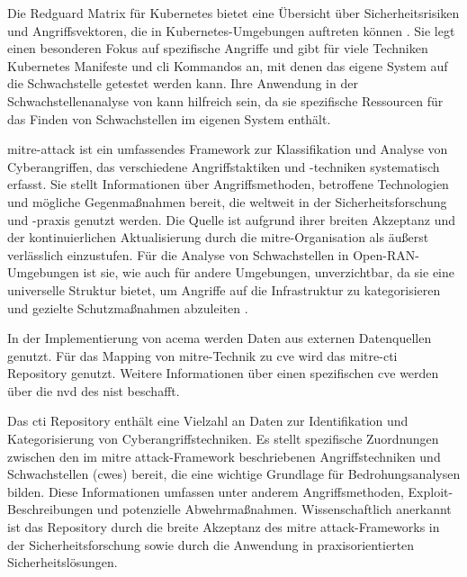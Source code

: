 \par Die Redguard Matrix für Kubernetes bietet eine Übersicht über Sicherheitsrisiken und Angriffsvektoren, die in Kubernetes-Umgebungen auftreten können \autocite{KubernetesThreatMatrix}. Sie legt einen besonderen Fokus auf spezifische Angriffe und gibt für viele Techniken Kubernetes Manifeste und \gls{cli} Kommandos an, mit denen das eigene System auf die Schwachstelle getestet werden kann. Ihre Anwendung in der Schwachstellenanalyse von \oran kann hilfreich sein, da sie spezifische Ressourcen für das Finden von Schwachstellen im eigenen System enthält.

\par \gls{mitre}-\gls{attack} ist ein umfassendes Framework zur Klassifikation und Analyse von Cyberangriffen, das verschiedene Angriffstaktiken und -techniken systematisch erfasst. Sie stellt Informationen über Angriffsmethoden, betroffene Technologien und mögliche Gegenmaßnahmen bereit, die weltweit in der Sicherheitsforschung und -praxis genutzt werden. Die Quelle ist aufgrund ihrer breiten Akzeptanz und der kontinuierlichen Aktualisierung durch die \gls{mitre}-Organisation als äußerst verlässlich einzustufen. Für die Analyse von Schwachstellen in Open-RAN-Umgebungen ist sie, wie auch für andere Umgebungen, unverzichtbar, da sie eine universelle Struktur bietet, um Angriffe auf die Infrastruktur zu kategorisieren und gezielte Schutzmaßnahmen abzuleiten \autocite{MITREATTCK}.
%
\par In der Implementierung von \gls{acema} werden Daten aus externen Datenquellen genutzt. Für das Mapping von \gls{mitre}-Technik zu \gls{cve} wird das \gls{mitre}-\gls{cti} Repository genutzt. Weitere Informationen über einen spezifischen \gls{cve} werden über die \gls{nvd} des \gls{nist} beschafft.
\par Das \gls{cti} Repository enthält eine Vielzahl an Daten zur Identifikation und Kategorisierung von Cyberangriffstechniken. Es stellt spezifische Zuordnungen zwischen den im \gls{mitre} \gls{attack}-Framework beschriebenen Angriffstechniken und Schwachstellen (\glspl{cwe}) bereit, die eine wichtige Grundlage für Bedrohungsanalysen bilden. Diese Informationen umfassen unter anderem Angriffsmethoden, Exploit-Beschreibungen und potenzielle Abwehrmaßnahmen. Wissenschaftlich anerkannt ist das Repository durch die breite Akzeptanz des \gls{mitre} \gls{attack}-Frameworks in der Sicherheitsforschung sowie durch die Anwendung in praxisorientierten Sicherheitslösungen.
